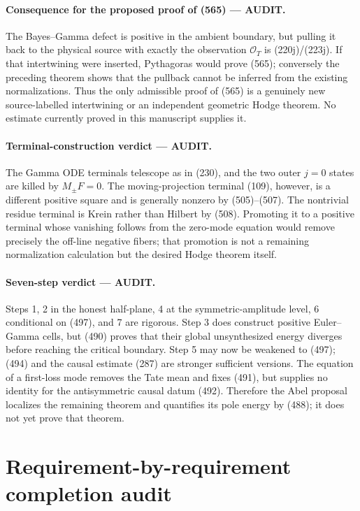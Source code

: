 \documentclass[11pt]{article}
\newcommand{\AUDIT}{\textcolor{orange!75!black}{\textbf{AUDIT}}}
\begin{document}
\paragraph{Consequence for the proposed proof of (565) --- \AUDIT.}
The Bayes--Gamma defect is positive in the ambient boundary, but pulling it
back to the physical source with exactly the observation
\(\mathcal O_T\) is (220j)/(223j).  If that intertwining were inserted,
Pythagoras would prove (565); conversely the preceding theorem shows that
the pullback cannot be inferred from the existing normalizations.  Thus the
only admissible proof of (565) is a genuinely new source-labelled
intertwining or an independent geometric Hodge theorem.  No estimate
currently proved in this manuscript supplies it.
\paragraph{Terminal-construction verdict --- \AUDIT.}
The Gamma ODE terminals telescope as in (230), and the two outer \(j=0\)
states are killed by \(M_\pm F=0\).  The moving-projection terminal (109),
however, is a different positive square and is generally nonzero by
(505)--(507).  The nontrivial residue terminal is Krein rather than Hilbert
by (508).  Promoting it to a positive terminal whose vanishing follows from
the zero-mode equation would remove precisely the off-line negative fibers;
that promotion is not a remaining normalization calculation but the desired
Hodge theorem itself.

\paragraph{Seven-step verdict --- \AUDIT.}
Steps 1, 2 in the honest half-plane, 4 at the symmetric-amplitude level, 6
conditional on (497), and 7 are rigorous.  Step 3 does construct positive
Euler--Gamma cells, but (490) proves that their global unsynthesized energy
diverges before reaching the critical boundary.  Step 5 may now be weakened
to (497); (494) and the causal estimate (287) are stronger sufficient
versions.  The equation of a first-loss mode
removes the Tate mean and fixes (491), but supplies no identity for the
antisymmetric causal datum (492).  Therefore the Abel proposal localizes the
remaining theorem and quantifies its pole energy by (488); it does not yet
prove that theorem.

\section{Requirement-by-requirement completion audit}
\end{document}
